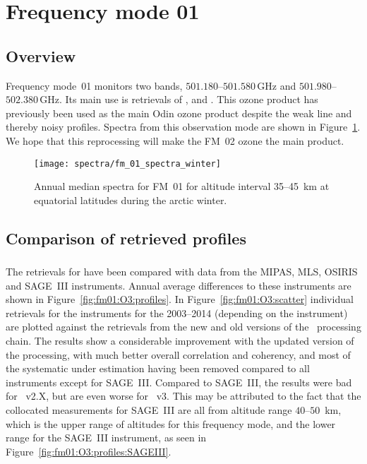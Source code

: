 \section{Frequency mode 01}
\label{sec:fm01}

\subsection{Overview}
\label{sec:fm01:overview}
Frequency mode~01 monitors two bands, $501.180$--$501.580\,\mathrm{GHz}$ and
$501.980$--$502.380\,\mathrm{GHz}$. Its main use is retrievals of ,
 and . This ozone product has previously been used as
the main Odin ozone product despite the weak line and thereby noisy profiles.
Spectra from this observation mode are shown in Figure~\ref{fig:spectra:01}.
We hope that this reprocessing will make the FM~02 ozone the main product.


\begin{figure}[ht]
    \centering
    \texttt{[image: spectra/fm\_01\_spectra\_winter]}
    \caption{Annual median spectra for FM~01 for altitude interval 35--45~km at
        equatorial latitudes during the arctic winter.
    }\label{fig:spectra:01}
\end{figure}


\subsection{Comparison of retrieved profiles}
\label{sec:fm01:comparison}



\subsubsection{}
\label{sec:fm01:comparison:O3}
The retrievals for  have been compared with data from the MIPAS, MLS,
OSIRIS and SAGE~III instruments. Annual average differences to these
instruments are shown in Figure~\ref{fig:fm01:O3:profiles}. In
Figure~\ref{fig:fm01:O3:scatter} individual retrievals for the instruments for
the 2003--2014 (depending on the instrument)  are plotted against the retrievals from the new and old
versions of the \smr\ processing chain. The results show a considerable
improvement with the updated version of the processing, with much better
overall correlation and coherency, and most of the systematic under
estimation having been removed compared to all instruments except for SAGE~III.
Compared to SAGE~III, the results were bad for \smr~v2.X, but are even worse
for \smr~v3. This may be attributed to the fact that the collocated measurements
for SAGE~III are all from altitude range $40$--$50$~km, which is the upper
range of altitudes for this frequency mode, and the lower range for the
SAGE~III instrument, as seen in Figure~\ref{fig:fm01:O3:profiles:SAGEIII}.

